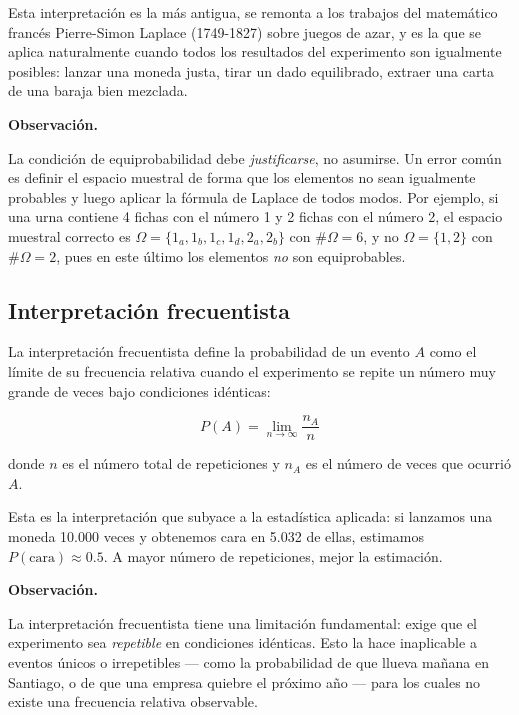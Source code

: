 \documentclass[12pt, a4paper]{book}
\newenvironment{observacion}{%
    \par\medskip\noindent\textbf{\color{azul}Observaci\'{o}n.}\enspace\itshape
}{\par\medskip}
\numberwithin{equation}{chapter}
\begin{document}
Esta interpretación es la más antigua, se remonta a los trabajos del matemático francés 
Pierre-Simon Laplace (1749-1827) sobre juegos de azar, y es la que se aplica naturalmente cuando 
todos los resultados del experimento son igualmente posibles: lanzar una 
moneda justa, tirar un dado equilibrado, extraer una carta de una baraja 
bien mezclada.

\begin{observacion}
	La condición de equiprobabilidad debe \textit{justificarse}, no 
	asumirse. Un error común es definir el espacio muestral de forma 
	que los elementos no sean igualmente probables y luego aplicar la 
	fórmula de Laplace de todos modos. Por ejemplo, si una urna contiene 
	4 fichas con el número 1 y 2 fichas con el número 2, el espacio 
	muestral correcto es $\Omega = \{1_a, 1_b, 1_c, 1_d, 2_a, 2_b\}$ 
	con $\#\Omega = 6$, y no $\Omega = \{1, 2\}$ con $\#\Omega = 2$, 
	pues en este último los elementos \textit{no} son equiprobables.
\end{observacion}

\subsection{Interpretación frecuentista}

La interpretación frecuentista define la probabilidad de un evento $A$ 
como el límite de su frecuencia relativa cuando el experimento se repite 
un número muy grande de veces bajo condiciones idénticas:

\[
P(A) = \lim_{n \to \infty} \frac{n_A}{n}
\]

donde $n$ es el número total de repeticiones y $n_A$ es el número de 
veces que ocurrió $A$.

Esta es la interpretación que subyace a la estadística aplicada: si 
lanzamos una moneda 10.000 veces y obtenemos cara en 5.032 de ellas, 
estimamos $P(\text{cara}) \approx 0.5$. A mayor número de repeticiones, 
mejor la estimación.

\begin{observacion}
	La interpretación frecuentista tiene una limitación fundamental: 
	exige que el experimento sea \textit{repetible} en condiciones 
	idénticas. Esto la hace inaplicable a eventos únicos o irrepetibles 
	— como la probabilidad de que llueva mañana en Santiago, o de que 
	una empresa quiebre el próximo año — para los cuales no existe una 
	frecuencia relativa observable.
\end{observacion}
\end{document}
